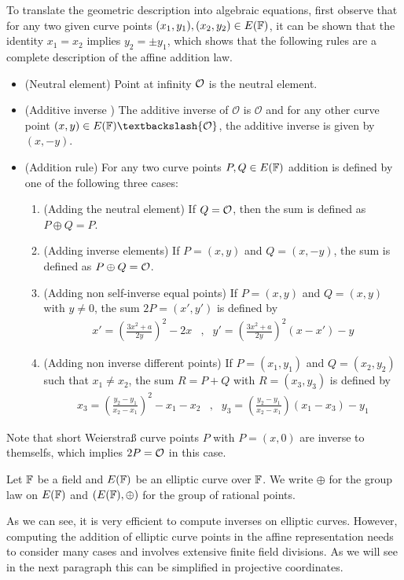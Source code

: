 To translate the geometric description into algebraic equations, first observe that for any two given curve points $(x_1,y_1), (x_2,y_2)\in E(\mathbb{F})$, it can be shown that the identity $x_1=x_2$ implies $y_2=\pm y_1$, which shows that the following rules are a complete description of the affine addition law.
\begin{itemize}
\item (Neutral element) Point at infinity $\mathcal{O}$ is the neutral element.
\item (Additive inverse ) The additive inverse of $\mathcal{O}$ is $\mathcal{O}$ and for any other curve point $(x,y) \in E(\F)\textbackslash \{\mathcal{O}\}$, the additive inverse is given by $(x,-y)$.
\item (Addition rule) For any two curve points $P, Q \in E(\mathbb{F})$ addition is defined by one of the following three cases:
\begin{enumerate}
\item (Adding the neutral element) If $Q=\mathcal{O}$, then the sum is defined as $P\oplus Q=P$.
\item (Adding inverse elements)  If $P=(x,y)$ and $Q=(x,-y)$, the sum is defined as $P\oplus Q=\mathcal{O}$.
\item (Adding non self-inverse equal points) If $P=(x,y)$ and $Q=(x,y)$ with $y\neq 0$, the sum $2P=(x',y')$ is defined by
$$
\begin{array}{llr}
x' = \left(\frac{3x^2+a}{2y}\right)^2 -2x &,&
y' = \left(\frac{3x^2+a}{2y}\right)^2\left(x-x'\right) - y
\end{array} 
$$
\item (Adding non inverse different points) If $P=(x_1,y_1)$ and $Q=(x_2,y_2)$ such that $x_1 \neq x_2$, the sum $R=P+Q$ with $R=(x_3,y_3)$ is defined by
$$
\begin{array}{llr}
x_3 = \left(\frac{y_2-y_1}{x_2-x_1}\right)^2 -x_1-x_2 &, &
y_3 = \left(\frac{y_2-y_1}{x_2-x_1} \right)\left(x_1-x_3\right) - y_1
\end{array} 
$$
\end{enumerate}
\end{itemize} 
Note that short Weierstraß curve points $P$ with $P=(x,0)$ are inverse to themselfs, which implies $2P=\mathcal{O}$ in this case.
\begin{notation}
Let $\mathbb{F}$ be a field and $E(\mathbb{F})$ be an elliptic curve over $\mathbb{F}$. We write $\oplus$ for the group law on $E(\mathbb{F})$ and $(E(\mathbb{F}),\oplus)$ for the group of rational points.
\end{notation}
As we can see, it is very efficient to compute inverses on elliptic curves. However, computing the addition of elliptic curve points in the affine representation needs to consider many cases and involves extensive finite field divisions. As we will see in the next paragraph this can be simplified in projective coordinates.

